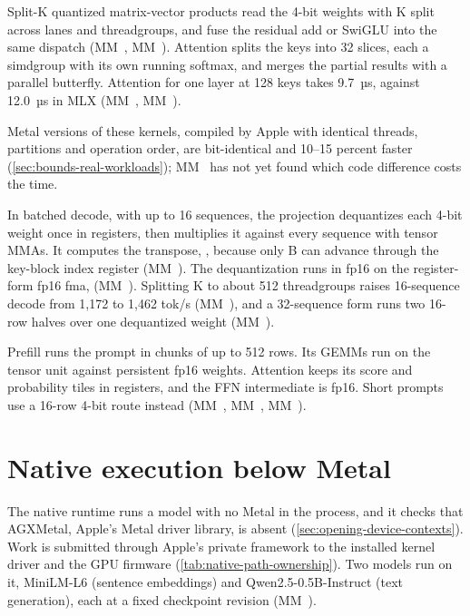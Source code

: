 Split-K quantized matrix-vector products read the 4-bit
weights with K split across lanes and threadgroups, and fuse the residual add or SwiGLU into the same dispatch
(MM~, MM~). Attention splits the keys into 32 slices, each a simdgroup with its own running
softmax, and merges the partial results with a parallel butterfly. Attention for one layer at 128 keys takes
9.7~µs, against 12.0~µs in MLX (MM~, MM~).

Metal versions of these kernels, compiled by Apple with identical threads, partitions and operation order, are
bit-identical and 10–15 percent faster (\cref{sec:bounds-real-workloads}); MM~ has not yet found which
code difference costs the time.

In batched decode, with up to 16 sequences, the projection dequantizes each 4-bit weight once in registers, then multiplies it against every sequence with tensor MMAs. It computes the
transpose, , because only B can advance through the key-block index register (MM~). The dequantization runs in fp16 on the register-form fp16 fma,  (MM~).
Splitting K to about 512 threadgroups raises 16-sequence decode from 1,172 to 1,462 tok/s (MM~), and a 32-sequence form runs two 16-row
halves over one dequantized weight (MM~).

Prefill runs the prompt in chunks of up to 512 rows. Its GEMMs run on the tensor unit against persistent fp16 weights.
Attention keeps its score and probability tiles in registers, and the FFN intermediate is fp16. Short prompts use a
16-row 4-bit route instead (MM~, MM~, MM~).

\section{Native execution below Metal}\label{ch:below-metal-native}

The native runtime runs a model with no Metal in the process, and it checks that AGXMetal, Apple's Metal driver
library, is absent (\cref{sec:opening-device-contexts}). Work is submitted through Apple's private
 framework to the installed kernel driver and the GPU firmware (\cref{tab:native-path-ownership}). Two models run on it, MiniLM-L6
(sentence embeddings) and Qwen2.5-0.5B-Instruct (text generation), each at a fixed checkpoint revision
(MM~).

